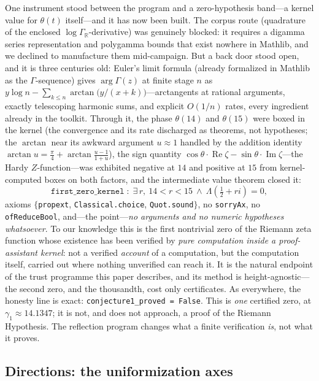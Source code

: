 One instrument stood between the program and a zero-hypothesis band---a
kernel value for $\theta(t)$ itself---and it has now been built. The corpus
route (quadrature of the enclosed $\log\Gamma_{\mathbb{R}}$-derivative) was
genuinely blocked: it requires a digamma series representation and polygamma
bounds that exist nowhere in Mathlib, and we declined to manufacture them
mid-campaign. But a back door stood open, and it is three centuries old:
Euler's limit formula (already formalized in Mathlib as the
$\Gamma$-sequence) gives $\arg\Gamma(z)$ at finite stage $n$ as
$y\log n - \sum_{k\le n} \arctan\!\big(y/(x+k)\big)$---arctangents at
rational arguments, exactly telescoping harmonic sums, and explicit
$O(1/n)$ rates, every ingredient already in the toolkit. Through it,
the phase $\theta(14)$ and $\theta(15)$ were boxed in the kernel (the
convergence and its rate discharged as theorems, not hypotheses; the
$\arctan$ near its awkward argument $u\approx1$ handled by the addition
identity $\arctan u = \tfrac\pi4 + \arctan\tfrac{u-1}{1+u}$), the sign
quantity $\cos\theta\cdot\operatorname{Re}\zeta -
\sin\theta\cdot\operatorname{Im}\zeta$---the Hardy $Z$-function---was
exhibited negative at $14$ and positive at $15$ from kernel-computed
boxes on both factors, and the intermediate value theorem closed it:
\[
  \texttt{first\_zero\_kernel} \;:\;
  \exists\, r,\ 14 < r < 15 \ \wedge\
  \Lambda\!\left(\tfrac12 + r i\right) = 0,
\]
axioms $\{$\texttt{propext}, \texttt{Classical.choice}, \texttt{Quot.sound}$\}$,
no \texttt{sorryAx}, no \texttt{ofReduceBool}, and---the point---\emph{no
arguments and no numeric hypotheses whatsoever}. To our knowledge this is
the first nontrivial zero of the Riemann zeta function whose existence has
been verified by \emph{pure computation inside a proof-assistant kernel}:
not a verified \emph{account} of a computation, but the computation itself,
carried out where nothing unverified can reach it. It is the natural
endpoint of the trust programme this paper describes, and its method is
height-agnostic---the second zero, and the thousandth, cost only
certificates. As everywhere, the honesty line is exact:
\texttt{conjecture1\_proved = False}. This is \emph{one} certified zero, at
$\gamma_1 \approx 14.1347$; it is not, and does not approach, a proof of the
Riemann Hypothesis. The reflection program changes what a finite
verification \emph{is}, not what it proves.

\subsection{Directions: the uniformization axes}

